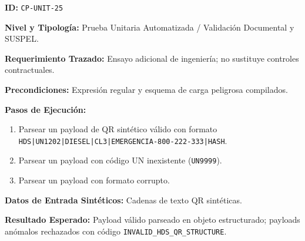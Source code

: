 \par\noindent\textbf{ID:} \texttt{C\allowbreak{}P\allowbreak{}-\allowbreak{}U\allowbreak{}N\allowbreak{}I\allowbreak{}T\allowbreak{}-\allowbreak{}2\allowbreak{}5\allowbreak{}}\par
\par\noindent\textbf{Nivel y Tipología:} Prueba Unitaria Automatizada / Validación Documental y SUSPEL.\par
\par\noindent\textbf{Requerimiento Trazado:} Ensayo adicional de ingeniería; no sustituye controles contractuales.\par
\par\noindent\textbf{Precondiciones:} Expresión regular y esquema de carga peligrosa compilados.\par
\par\noindent\textbf{Pasos de Ejecución:} \par
\begin{enumerate}
\item Parsear un payload de QR sintético válido con formato \texttt{H\allowbreak{}D\allowbreak{}S\allowbreak{}|\allowbreak{}U\allowbreak{}N\allowbreak{}1\allowbreak{}2\allowbreak{}0\allowbreak{}2\allowbreak{}|\allowbreak{}D\allowbreak{}I\allowbreak{}E\allowbreak{}S\allowbreak{}E\allowbreak{}L\allowbreak{}|\allowbreak{}C\allowbreak{}L\allowbreak{}3\allowbreak{}|\allowbreak{}E\allowbreak{}M\allowbreak{}E\allowbreak{}R\allowbreak{}G\allowbreak{}E\allowbreak{}N\allowbreak{}C\allowbreak{}I\allowbreak{}A\allowbreak{}-\allowbreak{}8\allowbreak{}0\allowbreak{}0\allowbreak{}-\allowbreak{}2\allowbreak{}2\allowbreak{}2\allowbreak{}-\allowbreak{}3\allowbreak{}3\allowbreak{}3\allowbreak{}|\allowbreak{}H\allowbreak{}A\allowbreak{}S\allowbreak{}H\allowbreak{}}.
\item Parsear un payload con código UN inexistente (\texttt{U\allowbreak{}N\allowbreak{}9\allowbreak{}9\allowbreak{}9\allowbreak{}9\allowbreak{}}).
\item Parsear un payload con formato corrupto.
\end{enumerate}
\par\noindent\textbf{Datos de Entrada Sintéticos:} Cadenas de texto QR sintéticas.\par
\par\noindent\textbf{Resultado Esperado:} Payload válido parseado en objeto estructurado; payloads anómalos rechazados con código \texttt{I\allowbreak{}N\allowbreak{}V\allowbreak{}A\allowbreak{}L\allowbreak{}I\allowbreak{}D\allowbreak{}\_\allowbreak{}H\allowbreak{}D\allowbreak{}S\allowbreak{}\_\allowbreak{}Q\allowbreak{}R\allowbreak{}\_\allowbreak{}S\allowbreak{}T\allowbreak{}R\allowbreak{}U\allowbreak{}C\allowbreak{}T\allowbreak{}U\allowbreak{}R\allowbreak{}E\allowbreak{}}.\par
